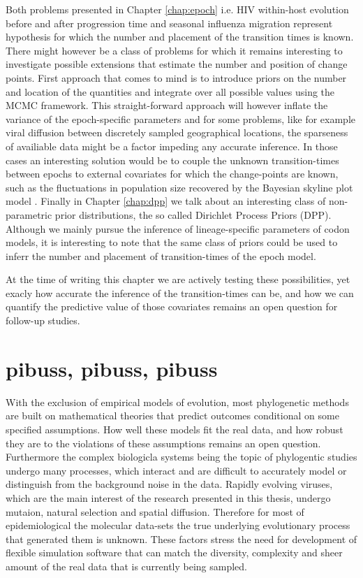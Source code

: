 Both problems presented in Chapter \ref{chap:epoch} i.e. HIV within-host evolution before and after progression time and seasonal influenza migration represent hypothesis for which the number and placement of the transition times is known.
There might however be a class of problems for which it remains interesting to investigate possible extensions that estimate the number and position of change points.
First approach that comes to mind is to introduce priors on the number and location of the quantities and integrate over all possible values using the MCMC framework.
This straight-forward approach will however inflate the variance of the epoch-specific parameters and for some problems, 
like for example viral diffusion between discretely sampled geographical locations, the sparseness of availiable data might be a factor impeding any accurate inference.
In those cases an interesting solution would be to couple the unknown transition-times between epochs to external covariates for which the change-points are known, such as  the fluctuations in population size recovered by the Bayesian skyline plot model \citep{Drummond2005}.
Finally in Chapter \ref{chap:dpp} we talk about an interesting class of non-parametric prior distributions, the so called Dirichlet Process Priors (DPP). 
Although we mainly pursue the inference of lineage-specific parameters of codon models, it is interesting to note that the same class of priors could be used to inferr the number and placement of transition-times of the epoch model.

At the time of writing this chapter we are actively testing these possibilities, yet exacly how accurate the inference of the transition-times can be, and how we can quantify the predictive value of those covariates remains an open question for follow-up studies.


\section{pibuss, pibuss, pibuss}

With the exclusion of empirical models of evolution, most phylogenetic methods are built on mathematical theories that predict outcomes conditional on some specified assumptions.
How well these models fit the real data, and how robust they are to the violations of these assumptions remains an open question.
Furthermore the complex biologicla systems being the topic of phylogentic studies undergo many processes, which interact and are difficult to accurately model or distinguish from the background noise in the data.
Rapidly evolving viruses, which are the main interest of the research presented in this thesis, undergo mutaion, natural selection and spatial diffusion.
Therefore for most of epidemiological the molecular data-sets the true underlying evolutionary process that generated them is unknown.
These factors stress the need for development of flexible simulation software that can match the diversity, complexity and sheer amount of the real data that is currently being sampled.

